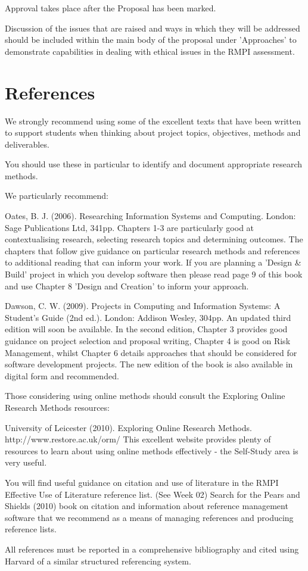 Approval takes place after the Proposal has been marked.  

Discussion of the issues that are raised and ways in which they will be addressed should be included within the main body of the proposal under 'Approaches' to demonstrate capabilities in dealing with ethical issues in the RMPI assessment. 

\section*{References}
We strongly recommend using some of the excellent texts that have been written to support students when thinking about project topics, objectives, methods and deliverables.

You should use these in particular to identify and document appropriate research methods.

We particularly recommend:

Oates, B. J. (2006). Researching Information Systems and Computing. London: Sage Publications Ltd, 341pp.
Chapters 1-3 are particularly good at contextualising research, selecting research topics and determining outcomes. The chapters that follow give guidance on particular research methods and references to additional reading that can inform your work. If you are planning a 'Design \& Build' project in which you develop software then please read page 9 of this book and use Chapter 8 'Design and Creation' to inform your approach.

Dawson, C. W. (2009). Projects in Computing and Information Systems: A Student's Guide (2nd ed.). London: Addison Wesley, 304pp.
An updated third edition will soon be available. In the second edition, Chapter 3 provides good guidance on project selection and proposal writing, Chapter 4 is good on Risk Management, whilst Chapter 6 details approaches that should be considered for software development projects.
The new edition of the book is also available in digital form and recommended. 

Those considering using online methods should consult the Exploring Online Research Methods resources:

University of Leicester (2010). Exploring Online Research Methods. 
http://www.restore.ac.uk/orm/
This excellent website provides plenty of resources to learn about using online methods effectively - the Self-Study area is very useful.

You will find useful guidance on citation and use of literature in the RMPI Effective Use of Literature reference list. (See Week 02) Search for the Pears and Shields (2010) book on citation and information about reference management software that we recommend as a means of managing references and producing reference lists.

All references must be reported in a comprehensive bibliography and cited using Harvard of a similar structured referencing system.
